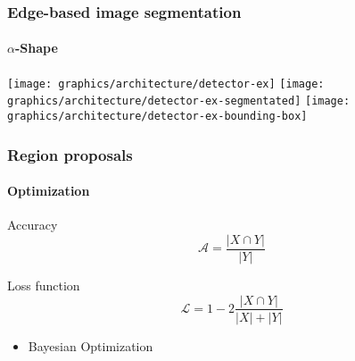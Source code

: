 \begin{frame}
	\frametitle{Edge-based image segmentation}
	\framesubtitle{$\alpha$-Shape}
	 {
			\texttt{[image: graphics/architecture/detector-ex]}
	}
	\only<2-3> {
			\texttt{[image: graphics/architecture/detector-ex-segmentated]}
	}
	\only<3-3> {
			\texttt{[image: graphics/architecture/detector-ex-bounding-box]}
	}
\end{frame}


\begin{frame}
	\frametitle{Region proposals}
    \framesubtitle{Optimization}
     {
        \begin{block}{Accuracy}
            \begin{equation*}
            \mathcal{A} = \frac{\lvert X \cap Y \rvert}{\lvert Y \rvert}
            \end{equation*}
        \end{block}
    }
	 {
        \begin{block}{Loss function}
            \begin{equation*}
            \mathcal{L} = 1 - 2 \frac{\lvert X \cap Y \rvert}{\lvert X \rvert + \lvert Y \rvert}
            \end{equation*}
        \end{block}
    }
     {
        \begin{itemize}
            \item Bayesian Optimization
        \end{itemize}
    }
\end{frame}

